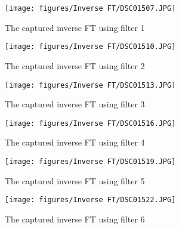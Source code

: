 \begin{figure}[H]
    \centering
    \begin{minipage}{0.45\textwidth}
        \centering
        \texttt{[image: figures/Inverse FT/DSC01507.JPG]}
        \caption{The captured inverse FT using filter 1}
    \end{minipage}%
    \begin{minipage}{0.45\textwidth}
        \centering
        \texttt{[image: figures/Inverse FT/DSC01510.JPG]}
        \caption{The captured inverse FT using filter 2}
    \end{minipage}%
    \vspace{2cm}
    \begin{minipage}{0.45\textwidth}
        \centering
        \texttt{[image: figures/Inverse FT/DSC01513.JPG]}
        \caption{The captured inverse FT using filter 3}
    \end{minipage}%
    \begin{minipage}{0.45\textwidth}
        \centering
        \texttt{[image: figures/Inverse FT/DSC01516.JPG]}
        \caption{The captured inverse FT using filter 4}
    \end{minipage}%
    \vspace{2cm}
    \begin{minipage}{0.45\textwidth}
        \centering
        \texttt{[image: figures/Inverse FT/DSC01519.JPG]}
        \caption{The captured inverse FT using filter 5}
    \end{minipage}%
    \begin{minipage}{0.45\textwidth}
        \centering
        \texttt{[image: figures/Inverse FT/DSC01522.JPG]}
        \caption{The captured inverse FT using filter 6}
    \end{minipage}%
\end{figure}